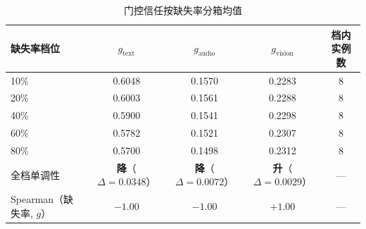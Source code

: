 \begin{table}[htbp]
  \centering\small
  \caption{门控信任按缺失率分箱均值}
  \label{tab:p2-gate}
  \begin{tabularx}{\textwidth}{@{}Xcccc@{}}
    \toprule
    缺失率档位 & $g_{\text{text}}$ & $g_{\text{audio}}$ & $g_{\text{vision}}$ & 档内实例数 \\
    \midrule
    10\% & 0.6048 & 0.1570 & 0.2283 & 8 \\
    20\% & 0.6003 & 0.1561 & 0.2288 & 8 \\
    40\% & 0.5900 & 0.1541 & 0.2298 & 8 \\
    60\% & 0.5782 & 0.1521 & 0.2307 & 8 \\
    80\% & 0.5700 & 0.1498 & 0.2312 & 8 \\
    \midrule
    全档单调性 & \textbf{降}（$\Delta=0.0348$） & \textbf{降}（$\Delta=0.0072$） & \textbf{升}（$\Delta=0.0029$） & --- \\
    Spearman（缺失率, $g$） & $-1.00$ & $-1.00$ & $+1.00$ & --- \\
    \bottomrule
  \end{tabularx}
  \par \smallskip
  \end{table}